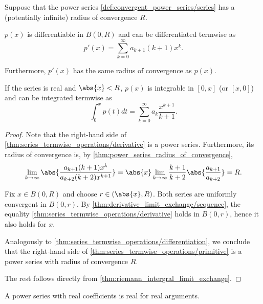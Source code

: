 \begin{theorem}\label{thm:series_termwise_operations}
  Suppose that the power series \eqref{def:convergent_power_series/series} has a (potentially infinite) radius of convergence \( R \).

  \begin{thmenum}
     \( p(x) \) is differentiable in \( B(0, R) \) and can be differentiated termwise as
    \begin{equation}\label{thm:series_termwise_operations/derivative}
      p'(x) = \sum_{k=0}^\infty a_{k+1} (k+1) x^k.
    \end{equation}

    Furthermore, \( p'(x) \) has the same radius of convergence as \( p(x) \).

     If the series is real and \( \abs{x} < R \), \( p(x) \) is integrable in \( [0, x] \) (or \( [x, 0] \)) and can be integrated termwise as
    \begin{equation}\label{thm:series_termwise_operations/primitive}
      \int_0^x p(t) dt = \sum_{k=0}^\infty a_k \frac {x^{k+1}} {k+1}.
    \end{equation}
  \end{thmenum}
\end{theorem}
\begin{proof}
   Note that the right-hand side of \cref{thm:series_termwise_operations/derivative} is a power series. Furthermore, its radius of convergence is, by \cref{thm:power_series_radius_of_convergence},
  \begin{equation*}
    \lim_{k \to \infty} \abs{\frac {a_{k+1} (k+1) x^k} {a_{k+2} (k+2) x^{k+1}}}
    =
    \abs{x} \lim_{k \to \infty} \frac {k+1} {k+2} \abs{\frac {a_{k+1}} {a_{k+2}}}
    =
    R.
  \end{equation*}

  Fix \( x \in B(0, R) \) and choose \( r \in (\abs{x}, R) \). Both series are uniformly convergent in \( B(0, r) \). By \cref{thm:derivative_limit_exchange/sequence}, the equality \cref{thm:series_termwise_operations/derivative} holds in \( B(0, r) \), hence it also holds for \( x \).

   Analogously to \cref{thm:series_termwise_operations/differentiation}, we conclude that the right-hand side of \cref{thm:series_termwise_operations/primitive} is a power series with radius of convergence \( R \).

  The rest follows directly from \cref{thm:riemann_intergral_limit_exchange}.
\end{proof}

\begin{proposition}\label{thm:real_power_series}
  A power series with real coefficients is real for real arguments.
\end{proposition}
